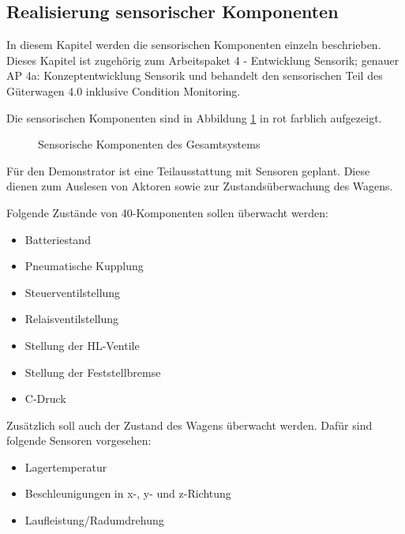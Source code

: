 \subsection{Realisierung sensorischer Komponenten}
In diesem Kapitel werden die sensorischen Komponenten einzeln beschrieben. Dieses Kapitel ist zugehörig zum Arbeitspaket 4 - Entwicklung Sensorik; genauer AP 4a: Konzeptentwicklung Sensorik und behandelt den sensorischen Teil des Güterwagen 4.0 inklusive Condition Monitoring.\par
Die sensorischen Komponenten sind in Abbildung \ref{fig:sKomp} in rot farblich aufgezeigt.
\begin{figure}[hbt]
    \centering
    
    \caption{Sensorische Komponenten des Gesamtsystems}
    \label{fig:sKomp}
\end{figure}
Für den Demonstrator ist eine Teilausstattung mit Sensoren geplant. Diese dienen zum Auslesen von Aktoren sowie zur Zustandsüberwachung des Wagens.\par
Folgende Zustände von \gls{40-Komponenten} sollen überwacht werden:
\begin{itemize}
    \item Batteriestand
    \item Pneumatische Kupplung
    \item Steuerventilstellung
    \item Relaisventilstellung
    \item Stellung der HL-Ventile
    \item Stellung der Feststellbremse
    \item C-Druck
\end{itemize}
Zusätzlich soll auch der Zustand des Wagens überwacht werden. Dafür sind folgende Sensoren vorgesehen:
\begin{itemize}
    \item Lagertemperatur
    \item Beschleunigungen in x-, y- und z-Richtung
    \item Laufleistung/Radumdrehung
\end{itemize}

\begin{comment}
\subsection{Konzept}
Condition Monitoring\\
Laderaumtemperatur\\
Türüberwachung\\
Stöße\\
Flachstellendetektion\\
Geschwindikeit\\
Laufleistung\\
Bremsbelag\\
Temperaturen\\
Batteriestand
\end{comment}


